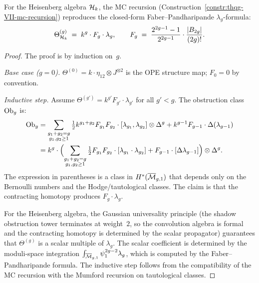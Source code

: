 \begin{theorem}
\label{thm:thqg-VII-recursion-closed}
For the Heisenberg algebra $\mathcal{H}_k$, the MC recursion
\textup{(}Construction~\textup{\ref{constr:thqg-VII-mc-recursion})}
reproduces the closed-form Faber--Pandharipande $\lambda_g$-formula:
\begin{equation}%
\Theta^{(g)}_{\cH_k}
\;=\;
k^g \cdot F_g \cdot \lambda_g,
\qquad
F_g
\;=\;
\frac{2^{2g-1}-1}{2^{2g-1}} \cdot
\frac{|B_{2g}|}{(2g)!}.
\end{equation}
\end{theorem}

\begin{proof}
The proof is by induction on~$g$.

\medskip\noindent\emph{Base case ($g = 0$).}
$\Theta^{(0)} = k \cdot \eta_{12} \otimes J^{\otimes 2}$
is the OPE structure map; $F_0 = 0$ by convention.

\medskip\noindent\emph{Inductive step.}
Assume $\Theta^{(g')} = k^{g'} F_{g'} \cdot \lambda_{g'}$
for all $g' < g$. The obstruction class $\mathrm{Ob}_g$ is:
\begin{align}
\mathrm{Ob}_g
&= \sum_{\substack{g_1+g_2=g\\g_1,g_2 \geq 1}}
 \tfrac{1}{2} k^{g_1+g_2} F_{g_1} F_{g_2}
 \cdot [\lambda_{g_1},\lambda_{g_2}]
 \otimes \Delta^g
 + k^{g-1} F_{g-1} \cdot \Delta(\lambda_{g-1})\notag\\
&= k^g \cdot
 \Bigl(
 \sum_{\substack{g_1+g_2=g\\g_1,g_2 \geq 1}}
 \tfrac{1}{2} F_{g_1} F_{g_2}
 \cdot [\lambda_{g_1} \cdot \lambda_{g_2}]
 + F_{g-1} \cdot [\Delta\lambda_{g-1}]
 \Bigr)
 \otimes \Delta^g.
\end{align}
The expression in parentheses is a class in
$H^*(\overline{\mathcal{M}}_{g,1})$ that depends only on the
Bernoulli numbers and the Hodge/tautological classes.
The claim is that the contracting homotopy produces
$F_g \cdot \lambda_g$.

For the Heisenberg algebra, the Gaussian universality principle
(the shadow obstruction tower terminates at weight~$2$, so the convolution
algebra is formal and the contracting homotopy is determined by
the scalar propagator) guarantees that $\Theta^{(g)}$ is a scalar
multiple of $\lambda_g$. The scalar coefficient is determined by
the moduli-space integration
$\int_{\overline{\mathcal{M}}_{g,1}} \psi_1^{2g-2} \lambda_g$, which
is computed by the Faber--Pandharipande formula. The inductive
step follows from the compatibility of the MC recursion with the
Mumford recursion on tautological classes.


\end{proof}
